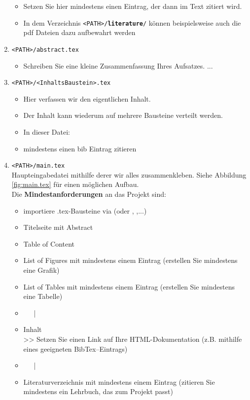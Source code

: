 \begin{enumerate}
\begin{itemize}
			\item Setzen Sie hier mindestens einen Eintrag, der dann im Text zitiert wird.
			\item In dem Verzeichnis \texttt{<PATH>/\textbf{literature}/} können beispielsweise auch die pdf Dateien dazu aufbewahrt werden
		\end{itemize}
		\item \texttt{<PATH>/abstract.tex}
		\begin{itemize}\small
			\item Schreiben Sie eine kleine Zusammenfassung Ihres Aufsatzes. ...
		\end{itemize}
		\item \texttt{<PATH>/<InhaltsBaustein>.tex}
		\begin{itemize}\small
			\item Hier verfassen wir den eigentlichen Inhalt.
			\item Der Inhalt kann wiederum auf mehrere Bausteine verteilt werden.
			\item In dieser Datei: \texttt{}
			\item mindestens einen bib Eintrag zitieren 
		\end{itemize}
		\item \texttt{<PATH>/main.tex}\\\small
		Haupteingabedatei mithilfe derer wir alles zusammenkleben. Siehe Abbildung \ref{fig:main.tex} für einen möglichen Aufbau.\\
		Die \textbf{Mindestanforderungen} an das Projekt sind:\vspace{-0.1cm}
		\begin{itemize}
			\item importiere .tex-Bausteine via  (oder , ,...)
			\item Titelseite mit Abstract
			\item Table of Content
			\item List of Figures mit mindestens einem Eintrag (erstellen Sie mindestens eine Grafik)
			\item List of Tables mit mindestens einem Eintrag (erstellen Sie mindestens eine Tabelle)
			\item[] ~~~|
			\item[] Inhalt\\
			\hspace*{0.5cm}>> Setzen Sie einen Link auf Ihre HTML-Dokumentation (z.B. mithilfe eines geeigneten BibTex--Eintrags)
			\item[] ~~~|
			\item Literaturverzeichnis mit mindestens einem Eintrag (zitieren Sie mindestens ein Lehrbuch, das zum Projekt passt)
		\end{itemize}
	\end{enumerate}
